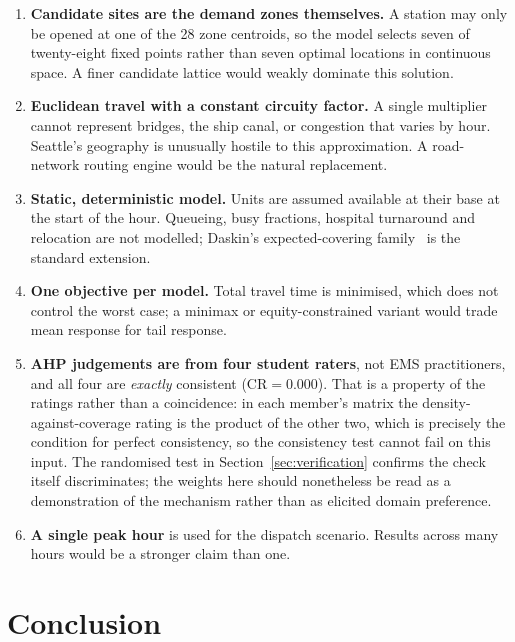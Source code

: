 \documentclass[conference]{IEEEtran}
\begin{document}
\begin{enumerate}
  \item \textbf{Candidate sites are the demand zones themselves.} A station
    may only be opened at one of the 28 zone centroids, so the model selects
    seven of twenty-eight fixed points rather than seven optimal locations in
    continuous space. A finer candidate lattice would weakly dominate this
    solution.
  \item \textbf{Euclidean travel with a constant circuity factor.} A single
    multiplier cannot represent bridges, the ship canal, or congestion that
    varies by hour. Seattle's geography is unusually hostile to this
    approximation. A road-network routing engine would be the natural
    replacement.
  \item \textbf{Static, deterministic model.} Units are assumed available at
    their base at the start of the hour. Queueing, busy fractions, hospital
    turnaround and relocation are not modelled; Daskin's expected-covering
    family~\cite{daskin1983} is the standard extension.
  \item \textbf{One objective per model.} Total travel time is minimised, which
    does not control the worst case; a minimax or equity-constrained variant
    would trade mean response for tail response.
  \item \textbf{AHP judgements are from four student raters}, not EMS
    practitioners, and all four are \emph{exactly} consistent
    ($\mathrm{CR}=0.000$). That is a property of the ratings rather than a
    coincidence: in each member's matrix the density-against-coverage rating is
    the product of the other two, which is precisely the condition for perfect
    consistency, so the consistency test cannot fail on this input. The
    randomised test in Section~\ref{sec:verification} confirms the check itself
    discriminates; the weights here should nonetheless be read as a
    demonstration of the mechanism rather than as elicited domain preference.
  \item \textbf{A single peak hour} is used for the dispatch scenario. Results
    across many hours would be a stronger claim than one.
\end{enumerate}

\section{Conclusion}
\end{document}
